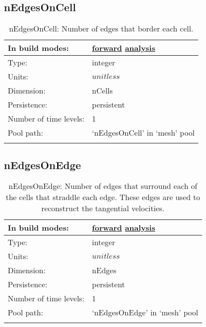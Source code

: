 \subsection[nEdgesOnCell]{nEdgesOnCell}
\label{subsec:var_sec_mesh_nEdgesOnCell}
\begin{center}
\begin{longtable}{| p{2.0in} | p{4.0in} |}
        \hline 
        In build modes: & \hyperref[subsec:forward_var_tab_mesh]{forward} \hyperref[subsec:analysis_var_tab_mesh]{analysis} \\
        \hline 
        Type: & integer \\
        \hline 
        Units: & $unitless$ \\
        \hline 
        Dimension: & nCells \\
        \hline 
        Persistence: & persistent \\
        \hline 
        Number of time levels: & 1 \\
        \hline 
            Pool path: & `nEdgesOnCell' in `mesh' pool \\
		 \hline 
    \caption{nEdgesOnCell: Number of edges that border each cell.}
\end{longtable}
\end{center}
\subsection[nEdgesOnEdge]{nEdgesOnEdge}
\label{subsec:var_sec_mesh_nEdgesOnEdge}
\begin{center}
\begin{longtable}{| p{2.0in} | p{4.0in} |}
        \hline 
        In build modes: & \hyperref[subsec:forward_var_tab_mesh]{forward} \hyperref[subsec:analysis_var_tab_mesh]{analysis} \\
        \hline 
        Type: & integer \\
        \hline 
        Units: & $unitless$ \\
        \hline 
        Dimension: & nEdges \\
        \hline 
        Persistence: & persistent \\
        \hline 
        Number of time levels: & 1 \\
        \hline 
            Pool path: & `nEdgesOnEdge' in `mesh' pool \\
		 \hline 
    \caption{nEdgesOnEdge: Number of edges that surround each of the cells that straddle each edge. These edges are used to reconstruct the tangential velocities.}
\end{longtable}
\end{center}
